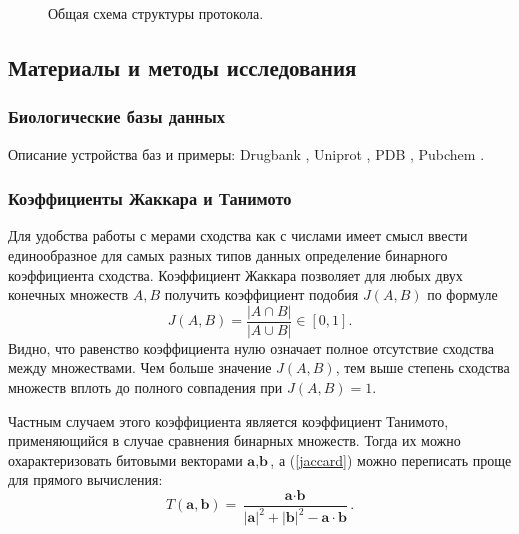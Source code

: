 \documentclass[a4paper,14pt]{article}         %
\begin{document}
\begin{figure}
	\begin{minipage}[!ht]{1\linewidth}
		\caption{Общая схема структуры протокола.}
		\label{structure}
	\end{minipage}
\end{figure}

\subsection{Материалы и методы исследования}
\subsubsection{Биологические базы данных}
\color{orange} Описание устройства баз и примеры: Drugbank \cite{drugbank}, Uniprot \cite{uniprot} , PDB \cite{pdb}, Pubchem \cite{pubchem}. \color{black}
\subsubsection{Коэффициенты Жаккара и Танимото}
Для удобства работы с мерами сходства как с числами имеет смысл ввести единообразное для самых разных типов данных определение бинарного коэффициента сходства. Коэффициент Жаккара \cite{Jaccard1901} позволяет для любых двух конечных множеств $A, B$ получить коэффициент подобия $J(A, B)$ по формуле
\begin{equation}
\label{jaccard}
J(A, B) = \frac{|A\cap B|}{|A\cup B|} \in [0, 1].
\end{equation}
Видно, что равенство коэффициента нулю означает полное отсутствие сходства между множествами. Чем больше значение $J(A, B)$, тем выше степень сходства множеств вплоть до полного совпадения при $J(A, B) = 1$.

Частным случаем этого коэффициента является коэффициент Танимото, применяющийся в случае сравнения бинарных множеств. Тогда их можно охарактеризовать битовыми векторами $\textbf{a}, \textbf{b}$, а (\ref{jaccard}) можно переписать проще для прямого вычисления:
\begin{equation}
T(\textbf{a}, \textbf{b}) = \frac{\textbf{a}\cdot\textbf{b}}{|\textbf{a}|^2 + |\textbf{b}|^2 - \textbf{a}\cdot\textbf{b}}.
\end{equation}
\end{document}

